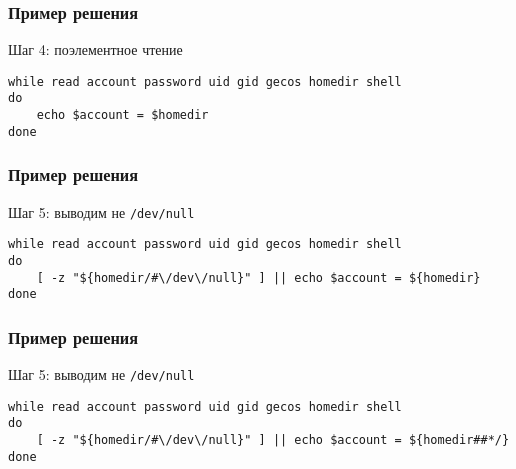 \begin{frame}[fragile]
	\frametitle{Пример решения}

	\begin{block}{Шаг 4: поэлементное чтение}

	\begin{lstlisting}
while read account password uid gid gecos homedir shell
do
    echo $account = $homedir
done
\end{lstlisting}

	\end{block}
\end{frame}

\begin{frame}[fragile]
	\frametitle{Пример решения}

	\begin{block}{Шаг 5: выводим не {\tt /dev/null}}

	\begin{lstlisting}
while read account password uid gid gecos homedir shell
do
    [ -z "${homedir/#\/dev\/null}" ] || echo $account = ${homedir}
done
\end{lstlisting}

	\end{block}
\end{frame}

\begin{frame}[fragile]
	\frametitle{Пример решения}

	\begin{block}{Шаг 5: выводим не {\tt /dev/null}}

	\begin{lstlisting}
while read account password uid gid gecos homedir shell
do
    [ -z "${homedir/#\/dev\/null}" ] || echo $account = ${homedir##*/}
done
\end{lstlisting}

	\end{block}
\end{frame}


